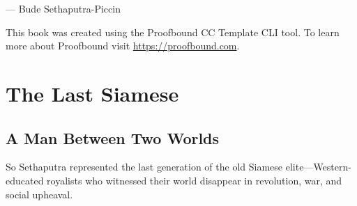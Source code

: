 \documentclass[
  Letterpaper,
]{scrbook}
\begin{document}
--- Bude Sethaputra-Piccin

\begin{tcolorbox}[enhanced jigsaw, colframe=quarto-callout-note-color-frame, bottomtitle=1mm, title=\textcolor{quarto-callout-note-color}{\faInfo}\hspace{0.5em}{About This Book}, leftrule=.75mm, toprule=.15mm, coltitle=black, colback=white, breakable, arc=.35mm, opacityback=0, colbacktitle=quarto-callout-note-color!10!white, toptitle=1mm, opacitybacktitle=0.6, bottomrule=.15mm, titlerule=0mm, rightrule=.15mm, left=2mm]

This book was created using the Proofbound CC Template CLI tool. To
learn more about Proofbound visit \url{https://proofbound.com}.

\end{tcolorbox}


\chapter{The Last Siamese}\label{sec-last-siamese}

\section{A Man Between Two Worlds}\label{a-man-between-two-worlds}

So Sethaputra represented the last generation of the old Siamese
elite---Western-educated royalists who witnessed their world disappear
in revolution, war, and social upheaval.
\end{document}

